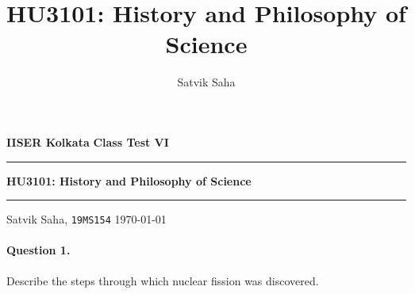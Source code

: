 \documentclass[11pt]{article}
\title{HU3101: History and Philosophy of Science}
\author{Satvik Saha}
\date{}
\theoremstyle{remark}
\begin{document}
    \noindent\textbf{IISER Kolkata} \hfill \textbf{Class Test VI}
    \vspace{3pt}
    \hrule
    \vspace{3pt}
    \begin{center}
    \LARGE{\textbf{HU3101: History and Philosophy of Science}}
    \end{center}
    \vspace{3pt}
    \hrule
    \vspace{3pt}
    Satvik Saha, \texttt{19MS154} \hfill \today
    \vspace{20pt}


    \paragraph{Question 1.} Describe the steps through which nuclear fission was
    discovered.
\end{document}
